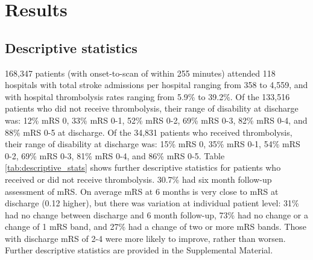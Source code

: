 \section{Results}

\subsection{Descriptive statistics}

168,347 patients (with onset-to-scan of within 255 minutes) attended 118 hospitals with total stroke admissions per hospital ranging from 358 to 4,559, and with hospital thrombolysis rates ranging from 5.9\% to 39.2\%. Of the 133,516 patients who did not receive thrombolysis, their range of disability at discharge was: 12\% mRS 0, 33\% mRS 0-1, 52\% mRS 0-2, 69\% mRS 0-3, 82\% mRS 0-4, and 88\% mRS 0-5 at discharge. Of the 34,831 patients who received thrombolysis, their range of disability at discharge was: 15\% mRS 0, 35\% mRS 0-1, 54\% mRS 0-2, 69\% mRS 0-3, 81\% mRS 0-4, and 86\% mRS 0-5. Table \ref{tab:descriptive_stats} shows further descriptive statistics for patients who received or did not receive thrombolysis. 30.7\% had six month follow-up assessment of mRS. On average mRS at 6 months is very close to mRS at discharge (0.12 higher), but there was variation at individual patient level: 31\% had no change between discharge and 6 month follow-up, 73\% had no change or a change of 1 mRS band, and 27\% had a change of two or more mRS bands. Those with discharge mRS of 2-4 were more likely to improve, rather than worsen. Further descriptive statistics are provided in the Supplemental Material.

